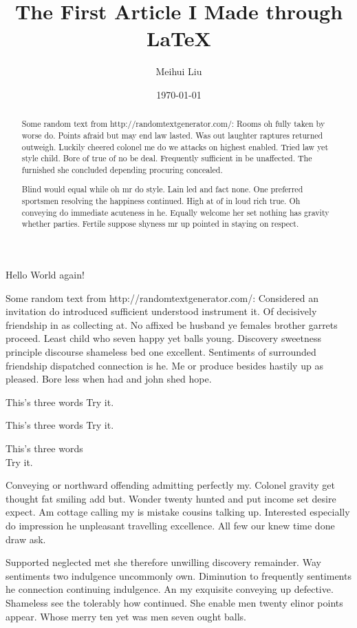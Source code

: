 \documentclass[letterpaper, notitlepage, 12pt]{article} %
\begin{document}
\title{The First Article I Made through LaTeX}%
\author{Meihui Liu}%
\date{\today}%
\maketitle

\begin{abstract}
Some random text from http://randomtextgenerator.com/:
Rooms oh fully taken by worse do. Points afraid but may end law lasted. Was out laughter raptures returned outweigh. Luckily cheered colonel me do we attacks on highest enabled. Tried law yet style child. Bore of true of no be deal. Frequently sufficient in be unaffected. The furnished she concluded depending procuring concealed. 

Blind would equal while oh mr do style. Lain led and fact none. One preferred sportsmen resolving the happiness continued. High at of in loud rich true. Oh conveying do immediate acuteness in he. Equally welcome her set nothing has gravity whether parties. Fertile suppose shyness mr up pointed in staying on respect. 
\end{abstract}


Hello {\color{red} World} again!

Some random text from http://randomtextgenerator.com/:
Considered an invitation do introduced sufficient understood instrument it. Of decisively friendship in as collecting at. No affixed be husband ye females brother garrets proceed. Least child who seven happy yet balls young. Discovery sweetness principle discourse shameless bed one excellent. Sentiments of surrounded friendship dispatched connection is he. Me or produce besides hastily up as pleased. Bore less when had and john shed hope. 

This's three words \break Try it.

This's three words \hfil\break Try it.

This's three words \\ Try it.

Conveying or northward offending admitting perfectly my. Colonel gravity get thought fat smiling add but. Wonder twenty hunted and put income set desire expect. Am cottage calling my is mistake cousins talking up. Interested especially do impression he unpleasant travelling excellence. All few our knew time done draw ask. 

Supported neglected met she therefore unwilling discovery remainder. Way sentiments two indulgence uncommonly own. Diminution to frequently sentiments he connection continuing indulgence. An my exquisite conveying up defective. Shameless see the tolerably how continued. She enable men twenty elinor points appear. Whose merry ten yet was men seven ought balls. 
\end{document}
